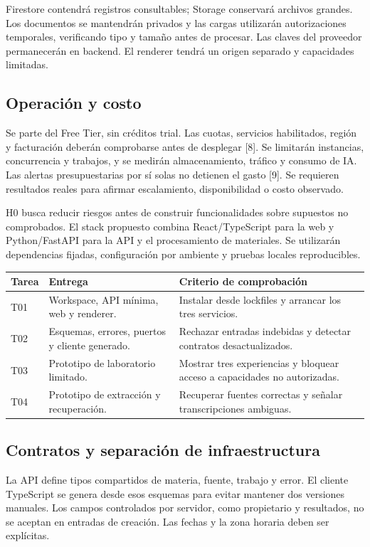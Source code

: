 Firestore contendrá registros consultables; Storage conservará archivos grandes. Los documentos se mantendrán privados y las cargas utilizarán autorizaciones temporales, verificando tipo y tamaño antes de procesar. Las claves del proveedor permanecerán en backend. El renderer tendrá un origen separado y capacidades limitadas.

\subsection*{Operación y costo}
Se parte del Free Tier, sin créditos trial. Las cuotas, servicios habilitados, región y facturación deberán comprobarse antes de desplegar [8]. Se limitarán instancias, concurrencia y trabajos, y se medirán almacenamiento, tráfico y consumo de IA. Las alertas presupuestarias por sí solas no detienen el gasto [9]. Se requieren resultados reales para afirmar escalamiento, disponibilidad o costo observado.



H0 busca reducir riesgos antes de construir funcionalidades sobre supuestos no comprobados. El stack propuesto combina React/TypeScript para la web y Python/FastAPI para la API y el procesamiento de materiales. Se utilizarán dependencias fijadas, configuración por ambiente y pruebas locales reproducibles.

\begin{tabularx}{\linewidth}{P{1.2cm}Y Y}
\toprule
\textbf{Tarea} & \textbf{Entrega} & \textbf{Criterio de comprobación}\\
\midrule
T01 & Workspace, API mínima, web y renderer. & Instalar desde lockfiles y arrancar los tres servicios.\\
T02 & Esquemas, errores, puertos y cliente generado. & Rechazar entradas indebidas y detectar contratos desactualizados.\\
T03 & Prototipo de laboratorio limitado. & Mostrar tres experiencias y bloquear acceso a capacidades no autorizadas.\\
T04 & Prototipo de extracción y recuperación. & Recuperar fuentes correctas y señalar transcripciones ambiguas.\\
\bottomrule
\end{tabularx}

\subsection*{Contratos y separación de infraestructura}
La API define tipos compartidos de materia, fuente, trabajo y error. El cliente TypeScript se genera desde esos esquemas para evitar mantener dos versiones manuales. Los campos controlados por servidor, como propietario y resultados, no se aceptan en entradas de creación. Las fechas y la zona horaria deben ser explícitas.

